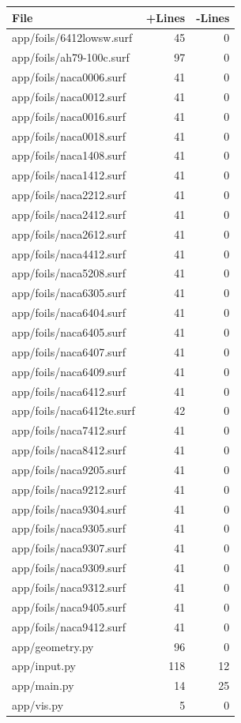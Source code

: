 \documentclass{article}
\begin{document}
\begin{longtable}{|p{10cm}|r|r|}
\hline \textbf{File} & \textbf{+Lines} & \textbf{-Lines} \\
\hline
app/foils/6412lowsw.surf & 45 & 0 \\
\hline
app/foils/ah79-100c.surf & 97 & 0 \\
\hline
app/foils/naca0006.surf & 41 & 0 \\
\hline
app/foils/naca0012.surf & 41 & 0 \\
\hline
app/foils/naca0016.surf & 41 & 0 \\
\hline
app/foils/naca0018.surf & 41 & 0 \\
\hline
app/foils/naca1408.surf & 41 & 0 \\
\hline
app/foils/naca1412.surf & 41 & 0 \\
\hline
app/foils/naca2212.surf & 41 & 0 \\
\hline
app/foils/naca2412.surf & 41 & 0 \\
\hline
app/foils/naca2612.surf & 41 & 0 \\
\hline
app/foils/naca4412.surf & 41 & 0 \\
\hline
app/foils/naca5208.surf & 41 & 0 \\
\hline
app/foils/naca6305.surf & 41 & 0 \\
\hline
app/foils/naca6404.surf & 41 & 0 \\
\hline
app/foils/naca6405.surf & 41 & 0 \\
\hline
app/foils/naca6407.surf & 41 & 0 \\
\hline
app/foils/naca6409.surf & 41 & 0 \\
\hline
app/foils/naca6412.surf & 41 & 0 \\
\hline
app/foils/naca6412te.surf & 42 & 0 \\
\hline
app/foils/naca7412.surf & 41 & 0 \\
\hline
app/foils/naca8412.surf & 41 & 0 \\
\hline
app/foils/naca9205.surf & 41 & 0 \\
\hline
app/foils/naca9212.surf & 41 & 0 \\
\hline
app/foils/naca9304.surf & 41 & 0 \\
\hline
app/foils/naca9305.surf & 41 & 0 \\
\hline
app/foils/naca9307.surf & 41 & 0 \\
\hline
app/foils/naca9309.surf & 41 & 0 \\
\hline
app/foils/naca9312.surf & 41 & 0 \\
\hline
app/foils/naca9405.surf & 41 & 0 \\
\hline
app/foils/naca9412.surf & 41 & 0 \\
\hline
app/geometry.py & 96 & 0 \\
\hline
app/input.py & 118 & 12 \\
\hline
app/main.py & 14 & 25 \\
\hline
app/vis.py & 5 & 0 \\
\hline
\end{longtable}
\end{document}

